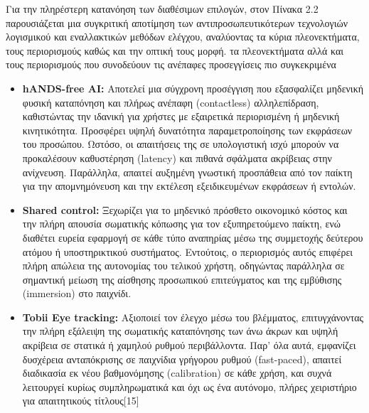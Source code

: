 \documentclass[twoside, a4paper, 11pt]{article}
\begin{document}
Για την πληρέστερη κατανόηση των διαθέσιμων επιλογών, στον Πίνακα 2.2 παρουσιάζεται μια συγκριτική αποτίμηση των αντιπροσωπευτικότερων τεχνολογιών λογισμικού και εναλλακτικών μεθόδων ελέγχου, αναλύοντας τα κύρια πλεονεκτήματα, τους περιορισμούς καθώς και την οπτική τους μορφή.
τα πλεονεκτήματα αλλά και τους περιορισμούς που συνοδεύουν τις ανέπαφες προσεγγίσεις πιο συγκεκριμένα
\begin{itemize}
    \item \textbf{hANDS-free AI:} Αποτελεί μια σύγχρονη προσέγγιση που εξασφαλίζει μηδενική φυσική καταπόνηση και πλήρως ανέπαφη (contactless) αλληλεπίδραση, καθιστώντας την ιδανική για χρήστες με εξαιρετικά περιορισμένη ή μηδενική κινητικότητα. Προσφέρει υψηλή δυνατότητα παραμετροποίησης των εκφράσεων του προσώπου. Ωστόσο, οι απαιτήσεις της σε υπολογιστική ισχύ μπορούν να προκαλέσουν καθυστέρηση (latency) και πιθανά σφάλματα ακρίβειας στην ανίχνευση. Παράλληλα, απαιτεί αυξημένη γνωστική προσπάθεια από τον παίκτη για την απομνημόνευση και την εκτέλεση εξειδικευμένων εκφράσεων ή εντολών.
    \item \textbf{Shared control:} Ξεχωρίζει για το μηδενικό πρόσθετο οικονομικό κόστος και την πλήρη απουσία σωματικής κόπωσης για τον εξυπηρετούμενο παίκτη, ενώ διαθέτει ευρεία εφαρμογή σε κάθε τύπο αναπηρίας μέσω της συμμετοχής δεύτερου ατόμου ή υποστηρικτικού συστήματος. Εντούτοις, ο περιορισμός αυτός επιφέρει πλήρη απώλεια της αυτονομίας του τελικού χρήστη, οδηγώντας παράλληλα σε σημαντική μείωση της αίσθησης προσωπικού επιτεύγματος και της εμβύθισης (immersion) στο παιχνίδι.
    \item \textbf{Tobii Eye tracking:}  Αξιοποιεί τον έλεγχο μέσω του βλέμματος, επιτυγχάνοντας την πλήρη εξάλειψη της σωματικής καταπόνησης των άνω άκρων και υψηλή ακρίβεια σε στατικά ή χαμηλού ρυθμού περιβάλλοντα. Παρ' όλα αυτά, εμφανίζει δυσχέρεια ανταπόκρισης σε παιχνίδια γρήγορου ρυθμού (fast-paced), απαιτεί διαδικασία εκ νέου βαθμονόμησης (calibration) σε κάθε χρήση, και συχνά λειτουργεί κυρίως συμπληρωματικά και όχι ως ένα αυτόνομο, πλήρες χειριστήριο για απαιτητικούς τίτλους[15]
\end{itemize}
\end{document}
